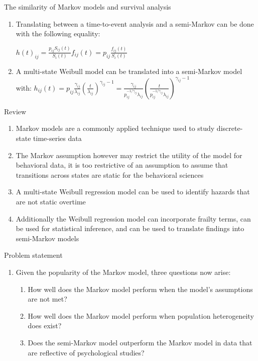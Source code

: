 \documentclass[
  ignorenonframetext,
]{beamer}
\providecommand{\tightlist}{%
  \setlength{\itemsep}{0pt}\setlength{\parskip}{0pt}}
\begin{document}
\begin{frame}{The similarity of Markov models and survival analysis}
\label{the-similarity-of-markov-models-and-survival-analysis}
\begin{enumerate}
\item
  Translating between a time-to-event analysis and a semi-Markov can be
  done with the following equality:

  \(h(t)_{ij}=\frac{p_{ij}S_{ij}(t)}{S_{i}(t)}f_{ij}(t)=p_{ij}\frac{f_{ij}(t)}{S_i(t)}\)
\item
  A multi-state Weibull model can be translated into a semi-Markov model
  with:
  \(h_{ij}(t)=p_{ij}\frac{\gamma_{ij}}{\lambda_{ij}}(\frac{t}{\lambda_{ij}})^{\gamma_{ij}-1}=\frac{\gamma_{ij}}{p_{ij}^{-1/\gamma_{ij}}\lambda_{ij}}(\frac{t}{p_{ij}^{-1/\gamma_{ij}}\lambda_{ij}})^{\gamma_{ij}-1}\)
\end{enumerate}
\end{frame}

\begin{frame}{Review}
\label{review}
\begin{enumerate}
\tightlist
\item
  Markov models are a commonly applied technique used to study
  discrete-state time-series data
\item
  The Markov assumption however may restrict the utility of the model
  for behavioral data, it is too restrictive of an assumption to assume
  that transitions across states are static for the behavioral sciences
\item
  A multi-state Weibull regression model can be used to identify hazards
  that are not static overtime
\item
  Additionally the Weibull regression model can incorporate frailty
  terms, can be used for statistical inference, and can be used to
  translate findings into semi-Markov models
\end{enumerate}
\end{frame}

\begin{frame}{Problem statement}
\label{problem-statement}
\begin{enumerate}
\tightlist
\item
  Given the popularity of the Markov model, three questions now arise:

  \begin{enumerate}
  \tightlist
  \item
    How well does the Markov model perform when the model's assumptions
    are not met?
  \item
    How well does the Markov model perform when population heterogeneity
    does exist?
  \item
    Does the semi-Markov model outperform the Markov model in data that
    are reflective of psychological studies?
  \end{enumerate}
\end{enumerate}
\end{frame}
\end{document}
